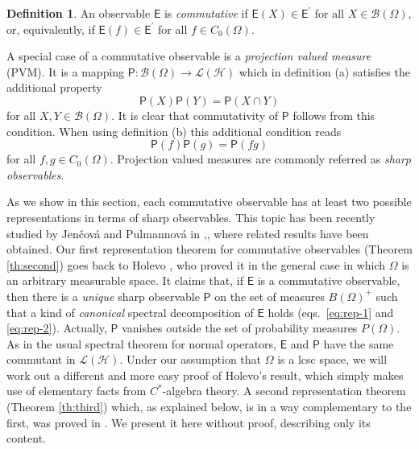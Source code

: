 \documentclass[12pt]{amsart}
\theoremstyle{definition}
\newtheorem{definition}{Definition}
\newcommand{\lh}{\mathcal{L(H)}} %
\newcommand{\Eo}{\mathsf{E}} %
\newcommand{\Po}{\mathsf{P}} %
\newcommand{\PP}{\mathsf{P}} %
\newcommand{\bor}[1]{\mathcal{B}(#1)} %
\newcommand{\frecc}{\rightarrow}
\begin{document}
\begin{definition}
An observable $\Eo$ is {\em commutative} if $\Eo (X) \in \Eo^\prime$ for all $X\in\bor{\Omega}$, or, equivalently, if $\Eo (f) \in \Eo^\prime$ for all $f\in C_0 (\Omega)$.
\end{definition}

A special case of a commutative observable is a {\em projection valued measure} (PVM). It is a mapping $\Po : \bor{\Omega}\frecc \lh$ which in definition {\rm (a)} satisfies the
additional property
\begin{equation*}
\Po(X)\Po(Y) = \Po (X\cap Y)
\end{equation*}
for all $X,Y\in\bor{\Omega}$. It is clear that commutativity of $\Po$ follows from this
condition. When using definition (b) this additional condition reads
\begin{equation*}
\Po (f) \Po (g) = \Po (fg)
\end{equation*}
for all $f,g \in C_0 (\Omega)$. Projection valued measures are commonly referred 
as \emph{sharp observables}.

As we show in this section, each commutative observable has at least two 
possible representations in terms of  sharp observables. This topic has been recently 
studied by Jen\v{c}ov\'{a} 
and Pulmannov\'{a} in \cite{JePu07},\cite{JePu09}, where related results have been 
obtained. Our first representation theorem for commutative observables (Theorem \ref{th:second}) 
goes back to Holevo \cite{Ho72}, who proved it in the general case in which $\Omega$ is 
an arbitrary measurable space. It claims that, if $\Eo$ is a commutative observable, then 
there is a {\em unique} sharp observable $\PP$ on the set of measures $B(\Omega)^+$ 
such that a kind of {\em canonical} spectral decomposition of $\Eo$ 
holds (eqs.~\eqref{eq:rep-1} and \eqref{eq:rep-2}). Actually, $\PP$ vanishes 
outside the set of probability measures $P(\Omega)$. As in the usual spectral theorem 
for normal operators, $\Eo$ and $\PP$ have the same commutant in $\lh$. Under our 
assumption that $\Omega$ is a lcsc space, we will work out a different and more 
easy proof of Holevo's result, which simply makes use of elementary facts from 
$C^\ast$-algebra theory. A second representation 
theorem (Theorem \ref{th:third}) which, as explained below, is  in a way  complementary to the first, was 
proved in \cite{Ali82}. We present it here  without proof, describing only its content.
\end{document}
